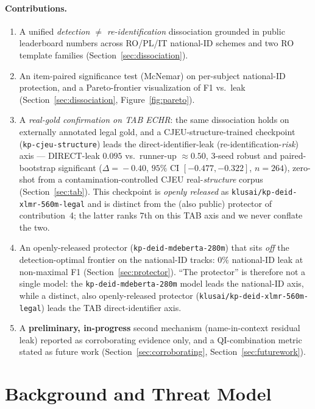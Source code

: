 \documentclass[11pt]{article}
\begin{document}
\paragraph{Contributions.}
\begin{enumerate}
  \item A unified \emph{detection $\neq$ re-identification} dissociation grounded in public
        leaderboard numbers across RO/PL/IT national-ID schemes and two RO template families
        (Section~\ref{sec:dissociation}).
  \item An item-paired significance test (McNemar) on per-subject national-ID protection, and a
        Pareto-frontier visualization of F1 vs.\ leak (Section~\ref{sec:dissociation},
        Figure~\ref{fig:pareto}).
  \item A \emph{real-gold confirmation on TAB ECHR}: the same dissociation holds on externally
        annotated legal gold, and a CJEU-structure-trained checkpoint
        (\texttt{kp-cjeu-structure}) leads the direct-identifier-leak (re-identification-\emph{risk})
        axis --- DIRECT-leak $0.095$ vs.\ runner-up $\approx\!0.50$, 3-seed robust and
        paired-bootstrap significant ($\Delta\!=\!-0.40$, $95\%$ CI $[-0.477,-0.322]$, $n{=}264$),
        zero-shot from a contamination-controlled CJEU real-\emph{structure} corpus
        (Section~\ref{sec:tab}). This checkpoint is \emph{openly released} as
        \texttt{klusai/kp-deid-xlmr-560m-legal} and is distinct from the (also public) protector
        of contribution~4; the latter ranks $7$th on this TAB axis and we never conflate
        the two.
  \item An openly-released protector (\texttt{kp-deid-mdeberta-280m}) that sits \emph{off} the
        detection-optimal frontier on the national-ID tracks: $0\%$ national-ID leak at non-maximal
        F1 (Section~\ref{sec:protector}). ``The protector'' is therefore not a single model: the
        \texttt{kp-deid-mdeberta-280m} model leads the national-ID axis, while a distinct, also
        openly-released protector (\texttt{klusai/kp-deid-xlmr-560m-legal}) leads the TAB
        direct-identifier axis.
  \item A \textbf{preliminary, in-progress} second mechanism (name-in-context residual leak) reported
        as corroborating evidence only, and a QI-combination metric stated as future work
        (Section~\ref{sec:corroborating}, Section~\ref{sec:futurework}).
\end{enumerate}

\section{Background and Threat Model}
\label{sec:threat}
\end{document}
